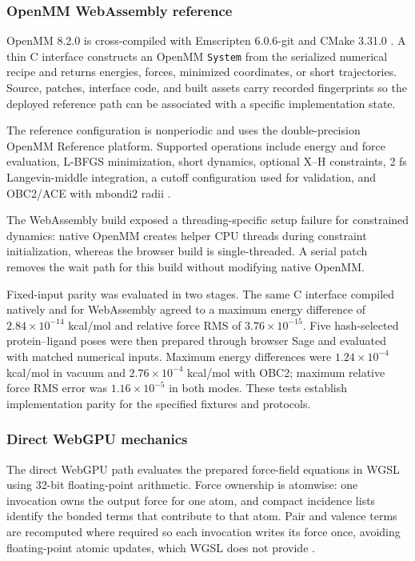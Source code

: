\documentclass[11pt]{article}
\begin{document}
\begin{small}
\subsubsection{OpenMM WebAssembly reference}

OpenMM 8.2.0 is cross-compiled with Emscripten 6.0.6-git and CMake 3.31.0 \citep{eastman2017openmm7,eastman2024openmm8}. A thin C interface constructs an OpenMM \texttt{System} from the serialized numerical recipe and returns energies, forces, minimized coordinates, or short trajectories. Source, patches, interface code, and built assets carry recorded fingerprints so the deployed reference path can be associated with a specific implementation state.

The reference configuration is nonperiodic and uses the double-precision OpenMM Reference platform. Supported operations include energy and force evaluation, L-BFGS minimization, short dynamics, optional X--H constraints, 2 fs Langevin-middle integration, a cutoff configuration used for validation, and OBC2/ACE with mbondi2 radii \citep{onufriev2004gb}.

The WebAssembly build exposed a threading-specific setup failure for constrained dynamics: native OpenMM creates helper CPU threads during constraint initialization, whereas the browser build is single-threaded. A serial patch removes the wait path for this build without modifying native OpenMM.

Fixed-input parity was evaluated in two stages. The same C interface compiled natively and for WebAssembly agreed to a maximum energy difference of $2.84 \times 10^{-14}$ kcal/mol and relative force RMS of $3.76 \times 10^{-15}$. Five hash-selected protein--ligand poses were then prepared through browser Sage and evaluated with matched numerical inputs. Maximum energy differences were $1.24 \times 10^{-4}$ kcal/mol in vacuum and $2.76 \times 10^{-4}$ kcal/mol with OBC2; maximum relative force RMS error was $1.16 \times 10^{-5}$ in both modes. These tests establish implementation parity for the specified fixtures and protocols.

\subsubsection{Direct WebGPU mechanics}

The direct WebGPU path evaluates the prepared force-field equations in WGSL using 32-bit floating-point arithmetic. Force ownership is atomwise: one invocation owns the output force for one atom, and compact incidence lists identify the bonded terms that contribute to that atom. Pair and valence terms are recomputed where required so each invocation writes its force once, avoiding floating-point atomic updates, which WGSL does not provide \citep{webgpuWGSL2026}.


\end{small}
\end{document}

